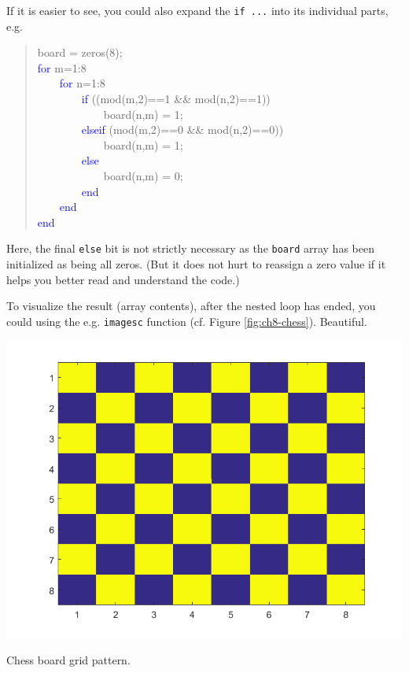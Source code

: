 \documentclass{tufte-book} %
\newenvironment{docspec}{\begin{quotation}\ttfamily\parskip0pt\parindent0pt\ignorespaces}{\end{quotation}}
\begin{document}
If it is easier to see, you could also expand the \texttt{if ...} into its individual parts, e.g.
\begin{docspec}
board = zeros(8);
\\\textcolor{blue}{for} m=1:8
\\ \ \ \ \ \textcolor{blue}{for} n=1:8
\\ \ \ \ \ \ \ \ \ \textcolor{blue}{if} ((mod(m,2)==1 \&\& mod(n,2)==1))
\\ \ \ \ \ \ \ \ \ \ \ \ \ board(n,m) = 1;
\\ \ \ \ \ \ \ \ \ \textcolor{blue}{elseif} (mod(m,2)==0 \&\& mod(n,2)==0))
\\ \ \ \ \ \ \ \ \ \ \ \ \ board(n,m) = 1;
\\ \ \ \ \ \ \ \ \ \textcolor{blue}{else}
\\ \ \ \ \ \ \ \ \ \ \ \ \ board(n,m) = 0;
\\ \ \ \ \ \ \ \ \ \textcolor{blue}{end}
\\ \ \ \ \ \textcolor{blue}{end}
\\\textcolor{blue}{end}
\end{docspec}
Here, the final \texttt{else} bit is not strictly necessary as the \texttt{board} array has been initialized as being all zeros. (But it does not hurt to reassign a zero value if it helps you better read and understand the code.)

To visualize the result (array contents), after the nested loop has ended, you could using the e.g. \texttt{imagesc} function (cf. Figure \ref{fig:ch8-chess}). Beautiful.

\begin{marginfigure}[0.0in]
\includegraphics[width=\linewidth]{ch8-chess.png}
\caption{Chess board grid pattern.}
\label{fig:ch8-chess}
\end{marginfigure}
\end{document}
